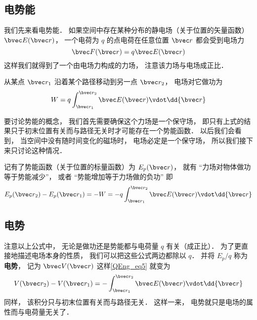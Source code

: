 

\subsection{电势能}
我们先来看电势能． 如果空间中存在某种分布的静电场（关于位置的矢量函数） $\bvec E(\bvec r)$， 一个电荷为 $q$ 的点电荷在任意位置 $\bvec r$ 都会受到电场力
\begin{equation}
\bvec F(\bvec r) = q \bvec E(\bvec r)
\end{equation}
这样我们就得到了一个由电场力构成的力场， 注意该力场与电场成正比． 

从某点 $\bvec r_1$ 沿着某个路径移动到另一点 $\bvec r_2$， 电场对它做功为
\begin{equation}\label{QEng_eq4}
W = q \int_{\bvec r_1}^{\bvec r_2} \bvec E(\bvec r) \vdot \dd{\bvec r}
\end{equation}

要讨论势能的概念， 我们首先需要确保这个力场是一个保守场， 即只有上式的结果只于初末位置有关而与路径无关时才可能存在一个势能函数． 以后我们会看到， 当空间中没有随时间变化的磁场时， 电场必定是一个保守场， %
所以我们接下来只讨论这种情况．

记有了势能函数（关于位置的标量函数）为 $E_p(\bvec r)$， 就有 “力场对物体做功等于势能减少”， 或者 “势能增加等于力场做的负功” 即
\begin{equation}\label{QEng_eq5}
E_p(\bvec r_2) - E_p(\bvec r_1) = -W = -q \int_{\bvec r_1}^{\bvec r_2} \bvec E(\bvec r) \vdot \dd{\bvec r}
\end{equation}

\subsection{电势}
注意以上公式中， 无论是做功还是势能都与电荷量 $q$ 有关（成正比）． 为了更直接地描述电场本身的性质， 我们可以把这些公式两边都除以 $q$． 并将 $E_p/q$ 称为\textbf{电势}， 记为 $\bvec V(\bvec r)$ 这样\autoref{QEng_eq5} 就变为
\begin{equation}
V(\bvec r_2) - V(\bvec r_1) = - \int_{\bvec r_1}^{\bvec r_2} \bvec E(\bvec r) \vdot \dd{\bvec r}
\end{equation}
同样， 该积分只与初末位置有关而与路径无关． 这样一来， 电势就只是电场的属性而与电荷量无关了．



